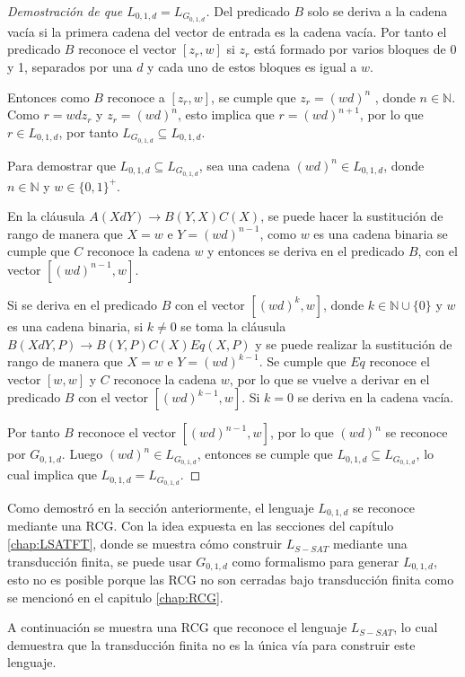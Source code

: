 \begin{proof}[Demostración de que $L_{0,1,d}=L_{G_{0,1,d}}$]
    Del predicado $B$ solo se deriva a la cadena vacía si la primera cadena del vector de entrada es la cadena vacía. Por tanto el predicado $B$ reconoce el vector $[z_r,w]$ si $z_r$ está formado por varios bloques de 0 y 1, separados por una $d$ y cada uno de estos bloques es igual a $w$.
    
    Entonces como $B$ reconoce a $[z_r,w]$, se cumple que $z_r=(wd)^n$ , donde $n\in \mathbb{N}$. Como $r=wdz_r$ y $z_r=(wd)^n$, esto implica que $r=(wd)^{n+1}$, por lo que $r\in L_{0,1,d}$, por tanto $L_{G_{0,1,d}}\subseteq L_{0,1,d}$.
    
    Para demostrar que $L_{0,1,d}\subseteq L_{G_{0,1,d}}$, sea una cadena $(wd)^n\in L_{0,1,d}$, donde $n\in \mathbb{N}$ y $w \in \{0,1\}^+$.
    
    En la cláusula $A(XdY)\to B(Y,X)C(X)$, se puede hacer la sustitución de rango de manera que $X=w$ e $Y=(wd)^{n-1}$, como $w$ es una cadena binaria se cumple que $C$ reconoce la cadena $w$ y entonces se deriva en el predicado $B$, con el vector $[(wd)^{n-1},w]$.
    
    Si se deriva en el predicado $B$ con el vector $[(wd)^k,w]$, donde 
    $k\in \mathbb{N} \cup \{0\}$ y $w$ es una cadena binaria, si $k\neq 0$ se toma la cláusula
    $B(XdY,P)\to B(Y,P) C(X) Eq(X,P)$ y se puede realizar la sustitución de rango de manera que
    $X=w$ e $Y=(wd)^{k-1}$. Se cumple que $Eq$ reconoce el vector $[w,w]$ y $C$ reconoce la cadena $w$,
    por lo que se vuelve a derivar en el  predicado $B$ con el vector $[(wd)^{k-1},w]$. Si $k=0$ se deriva
    en la cadena vacía.
    
    Por tanto $B$ reconoce el vector $[(wd)^{n-1},w]$, por lo que $(wd)^n$ se reconoce por $G_{0,1,d}$. Luego
    $(wd)^n\in L_{G_{0,1,d}}$, entonces se cumple que $L_{0,1,d}\subseteq L_{G_{0,1,d}}$, lo cual implica
    que $L_{0,1,d} = L_{G_{0,1,d}}$.
\end{proof}

Como demostró en la sección anteriormente, el lenguaje $L_{0,1,d}$ se reconoce mediante una RCG.  Con la idea expuesta en las secciones del capítulo \ref{chap:LSATFT}, donde se muestra cómo construir $L_{S-SAT}$ mediante una transducción finita, se puede usar $G_{0,1,d}$ como formalismo para generar $L_{0,1,d}$, esto no es posible porque las RCG no son cerradas bajo transducción finita como se mencionó en el capitulo \ref{chap:RCG}.

A continuación se muestra una RCG que reconoce el lenguaje $L_{S-SAT}$, lo cual demuestra que la transducción finita no es la única vía para construir este lenguaje.

